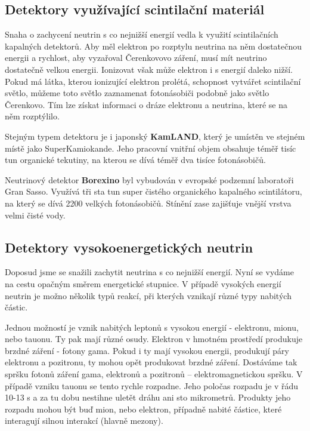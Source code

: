 \documentclass[../../main.tex]{subfiles}
\begin{document}
\subsection{Detektory využívající scintilační materiál}

Snaha o zachycení neutrin s co nejnižší energií vedla k využití scintilačních kapalných detektorů. Aby měl elektron po rozptylu neutrina na něm dostatečnou energii a rychlost, aby vyzařoval Čerenkovovo záření, musí mít neutrino dostatečně velkou energii. Ionizovat však může elektron i s energií daleko nižší. Pokud má látka, kterou ionizující elektron prolétá, schopnost vytvářet scintilační světlo, můžeme toto světlo zaznamenat fotonásobiči podobně jako světlo Čerenkovo. Tím lze získat informaci o dráze elektronu a neutrina, které se na něm rozptýlilo.

Stejným typem detektoru je i japonský \textbf{KamLAND}, který je umístěn ve stejném místě jako SuperKamiokande. Jeho pracovní vnitřní objem obsahuje téměř tisíc tun organické tekutiny, na kterou se dívá téměř dva tisíce fotonásobičů.

Neutrinový detektor \textbf{Borexino} byl vybudován v evropské podzemní laboratoři Gran Sasso. Využívá tři sta tun super čistého organického kapalného scintilátoru, na který se dívá 2200 velkých fotonásobičů. Stínění zase zajišťuje vnější vrstva velmi čisté vody.

\subsection{Detektory vysokoenergetických neutrin}

Doposud jsme se snažili zachytit neutrina s co nejnižší energií. Nyní se vydáme na cestu opačným směrem energetické stupnice. V případě vysokých energií neutrin je možno několik typů reakcí, při kterých vznikají různé typy nabitých částic.

Jednou možností je vznik nabitých leptonů s vysokou energií - elektronu, mionu, nebo tauonu. Ty pak mají různé osudy. Elektron v hmotném prostředí produkuje brzdné záření - fotony gama. Pokud i ty mají vysokou energii, produkují páry elektronu a pozitronu, ty mohou opět produkovat brzdné záření. Dostáváme tak spršku fotonů záření gama, elektronů a pozitronů – elektromagnetickou spršku. V případě vzniku tauonu se tento rychle rozpadne. Jeho poločas rozpadu je v řádu 10-13 s a za tu dobu nestihne uletět dráhu ani sto mikrometrů. Produkty jeho rozpadu mohou být buď mion, nebo elektron, případně nabité částice, které interagují silnou interakcí (hlavně mezony).
\end{document}
